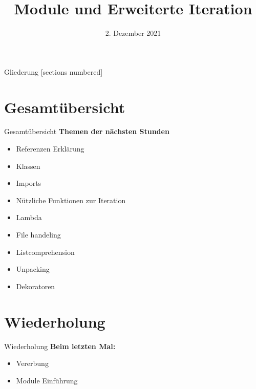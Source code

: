 



\title{Module und Erweiterte Iteration}
\date{2. Dezember 2021}


	
\maketitle

\begin{frame}{Gliederung}
	[sections numbered]
	\tableofcontents
\end{frame}

\section*{Gesamtübersicht}
\begin{frame}{Gesamtübersicht}
	\textbf{Themen der nächsten Stunden}
	\begin{itemize}
		\item Referenzen Erklärung
		\item  Klassen
		\item \alert{Imports}
		\item \alert{Nützliche Funktionen zur Iteration}
		\item Lambda
		\item File handeling
		\item Listcomprehension
		\item Unpacking
		\item Dekoratoren
	\end{itemize}
\end{frame}

\section{Wiederholung}
\begin{frame}{Wiederholung}
	\textbf{Beim letzten Mal:}
	\begin{itemize}
		\item Vererbung
		
		\item Module Einführung
		
	\end{itemize}	
\end{frame}

